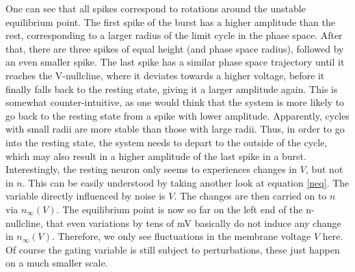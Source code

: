 \documentclass[12pt,a4paper]{article}
\begin{document}
One can see that all spikes correspond to rotations around the unstable equilibrium point. The first spike of the burst has a higher amplitude than the rest, corresponding to a larger radius of the limit cycle in the phase space. After that, there are three spikes of equal height (and phase space radius), followed by an even smaller spike. The last spike has a similar phase space trajectory until it reaches the V-nullcline, where it deviates towards a higher voltage, before it finally falls back to the resting state, giving it a larger amplitude again. This is somewhat counter-intuitive, as one would think that the system is more likely to go back to the resting state from a spike with lower amplitude. Apparently, cycles with small radii are more stable than those with large radii. Thus, in order to go into the resting state, the system needs to depart to the outside of the cycle, which may also result in a higher amplitude of the last spike in a burst.\\
Interestingly, the resting neuron only seems to experiences changes in $V$, but not in $n$. This can be easily understood by taking another look at equation \ref{neq}. The variable directly influenced by noise is $V$. The changes are then carried on to $n$ via $n_\infty(V)$. The equilibrium point is now so far on the left end of the n-nullcline, that even variations by tens of mV basically do not induce any change in $n_\infty(V)$. Therefore, we only see fluctuations in the membrane voltage $V$ here. Of course the gating variable is still subject to perturbations, these just happen on a much smaller scale.
\end{document}
